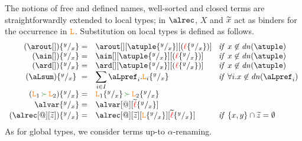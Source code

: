 The notions of free and defined names, well-sorted and closed terms
are straightforwardly extended to local types; in $\alrec$, 
 $X$ and $\widetilde{x}$ act as binders for the occurrence in $\texttt{\textcolor{orange}L}$.
%
%
%
Substitution on local types is defined as follows. 
\[
\begin{array}{rl@{\hspace{.3cm}}l}
  (\arout[]) \sust x y  = &  \arout[][\atuple\sust x y][(\alocvar\sust x y)] &  {\it if}\  x\not\in\dn\atuple
  \\
  (\ain[]) \sust x y  = &  \ain[][\atuple\sust x y][(\alocvar\sust x y)] &  {\it if}\  x\not\in\dn\atuple
  \\
  (\ard[]) \sust x y  = &  \ard[][\atuple\sust x y][(\alocvar\sust x y)] &  {\it if}\  x\not\in\dn\atuple
  \\
   (\aLsum)\sust x y  = & \displaystyle{\sum_{i\in I} {{\aLpref_{i}.\aL_{i}}\sust x y}}
   &  {\it if}\  \forall i. x\not\in\dn{\aLpref_i}
  \\
  (\aL_1\seqop\aL_2)\sust x y  = &  \aL_1\sust x y\seqop  \aL_2\sust x y 
  \\
  \alvar\sust x y  = & \alvar[@][\seq\alocvar\sust x y]  
  \\
  (\alrec[@][\seq z])\sust x y  = & \alrec[@][\seq z][\aL\sust x y][\seq\alocvar\sust x y] &  {\it if}\  \{x,y\}\cap\seq z = \emptyset
\end{array}
\]
%
%
%
%
%
As for global types, we consider terms up-to $\alpha$-renaming.
 
